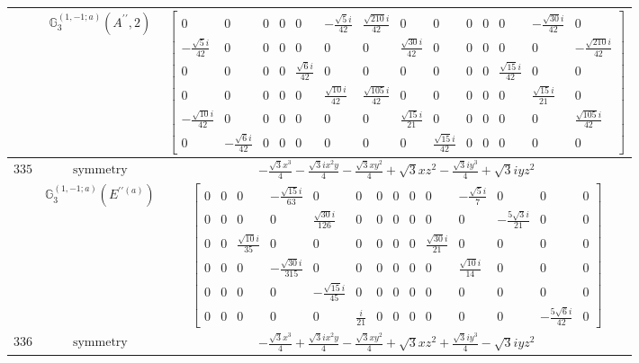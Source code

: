 \documentclass[fleqn,8pt,landscape]{jsarticle}
\begin{document}
\begin{longtable}{ccc}
$  $ & $ \mathbb{G}_{3}^{(1,-1;a)}(A^{\prime\prime},2) $ & $ \begin{bmatrix} 0 & 0 & 0 & 0 & 0 & - \frac{\sqrt{5} i}{42} & \frac{\sqrt{210} i}{42} & 0 & 0 & 0 & 0 & 0 & - \frac{\sqrt{30} i}{42} & 0 \\ - \frac{\sqrt{5} i}{42} & 0 & 0 & 0 & 0 & 0 & 0 & \frac{\sqrt{30} i}{42} & 0 & 0 & 0 & 0 & 0 & - \frac{\sqrt{210} i}{42} \\ 0 & 0 & 0 & 0 & \frac{\sqrt{6} i}{42} & 0 & 0 & 0 & 0 & 0 & 0 & \frac{\sqrt{15} i}{42} & 0 & 0 \\ 0 & 0 & 0 & 0 & 0 & \frac{\sqrt{10} i}{42} & \frac{\sqrt{105} i}{42} & 0 & 0 & 0 & 0 & 0 & \frac{\sqrt{15} i}{21} & 0 \\ - \frac{\sqrt{10} i}{42} & 0 & 0 & 0 & 0 & 0 & 0 & \frac{\sqrt{15} i}{21} & 0 & 0 & 0 & 0 & 0 & \frac{\sqrt{105} i}{42} \\ 0 & - \frac{\sqrt{6} i}{42} & 0 & 0 & 0 & 0 & 0 & 0 & \frac{\sqrt{15} i}{42} & 0 & 0 & 0 & 0 & 0 \end{bmatrix} $ \\ \hline
$ 335 $ & $ \text{symmetry} $ & $ - \frac{\sqrt{3} x^{3}}{4} - \frac{\sqrt{3} i x^{2} y}{4} - \frac{\sqrt{3} x y^{2}}{4} + \sqrt{3} x z^{2} - \frac{\sqrt{3} i y^{3}}{4} + \sqrt{3} i y z^{2} $ \\
$  $ & $ \mathbb{G}_{3}^{(1,-1;a)}(E^{\prime\prime(a)}) $ & $ \begin{bmatrix} 0 & 0 & 0 & - \frac{\sqrt{15} i}{63} & 0 & 0 & 0 & 0 & 0 & 0 & - \frac{\sqrt{5} i}{7} & 0 & 0 & 0 \\ 0 & 0 & 0 & 0 & \frac{\sqrt{30} i}{126} & 0 & 0 & 0 & 0 & 0 & 0 & - \frac{5 \sqrt{3} i}{21} & 0 & 0 \\ 0 & 0 & \frac{\sqrt{10} i}{35} & 0 & 0 & 0 & 0 & 0 & 0 & \frac{\sqrt{30} i}{21} & 0 & 0 & 0 & 0 \\ 0 & 0 & 0 & - \frac{\sqrt{30} i}{315} & 0 & 0 & 0 & 0 & 0 & 0 & \frac{\sqrt{10} i}{14} & 0 & 0 & 0 \\ 0 & 0 & 0 & 0 & - \frac{\sqrt{15} i}{45} & 0 & 0 & 0 & 0 & 0 & 0 & 0 & 0 & 0 \\ 0 & 0 & 0 & 0 & 0 & \frac{i}{21} & 0 & 0 & 0 & 0 & 0 & 0 & - \frac{5 \sqrt{6} i}{42} & 0 \end{bmatrix} $ \\ \hline
$ 336 $ & $ \text{symmetry} $ & $ - \frac{\sqrt{3} x^{3}}{4} + \frac{\sqrt{3} i x^{2} y}{4} - \frac{\sqrt{3} x y^{2}}{4} + \sqrt{3} x z^{2} + \frac{\sqrt{3} i y^{3}}{4} - \sqrt{3} i y z^{2} $ \\

\end{longtable}
\end{document}
